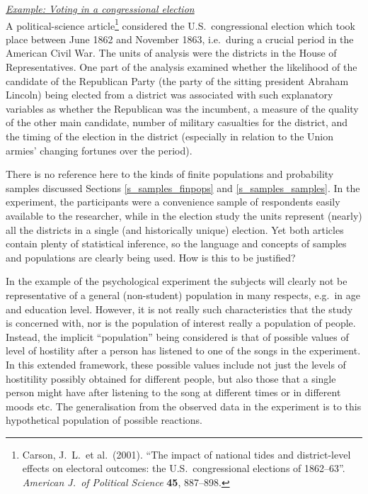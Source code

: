 \underline{\emph{Example: Voting in a congressional election}}\\
A political-science article\footnote{ Carson, J.\ L.\ et al.\ (2001).
``The impact of national tides and district-level effects on electoral
outcomes: the U.S.\ congressional elections of 1862--63''.
\emph{American J.\ of Political Science} \textbf{45}, 887--898.}
considered the U.S.\ congressional election which took place between
June 1862 and November 1863, i.e.\ during a crucial period in the
American Civil War. The units of analysis were the districts
in the House of Representatives. One part of the analysis examined whether the
likelihood of the candidate of the Republican Party (the party of the
sitting president Abraham Lincoln) being elected from a district was
associated with such explanatory variables as whether the Republican was
the incumbent, a measure of the quality of the other main candidate,
number of military casualties for the district, and the timing of the
election in the district (especially in relation to the Union armies'
changing fortunes over the period).

There is no reference here to the kinds of finite populations and
probability samples discussed Sections \ref{s_samples_finpops} and
\ref{s_samples_samples}. In the  experiment, the
participants were a convenience sample of respondents easily
available to the researcher, while in the election study the units
represent (nearly) all the districts in a single (and historically
unique) election. Yet both articles contain plenty of statistical
inference, so the language and concepts of samples and populations are
clearly being used. How is this to be justified?

In the example of the psychological experiment the subjects will clearly
not be representative of a general (non-student) population in many
respects, e.g.\ in age and education level. However, it
is not really such characteristics that the study is concerned with, nor
is the population of interest really a population of people. Instead,
the implicit ``population'' being considered is that of possible values
of level of hostility after a person has
listened to one of the songs in the experiment. In this extended
framework, these possible values include not just the levels of
hostitility possibly obtained for different people, but also those that
a single person might have after listening to the song at different
times or in different moods etc. The generalisation from the observed
data in the experiment is to this hypothetical population of possible
reactions.

